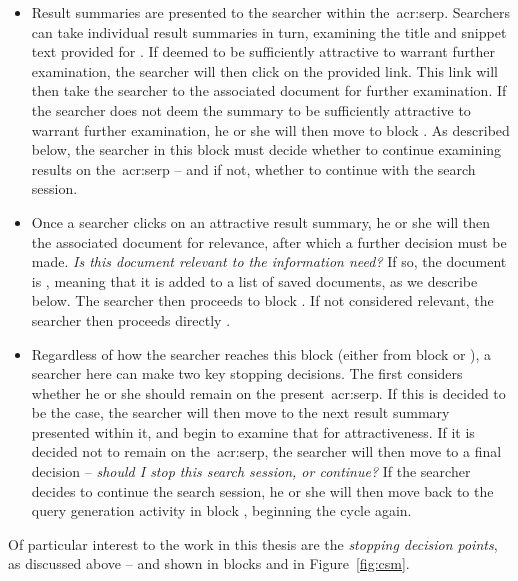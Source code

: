 \begin{itemize}
    \item[\blueboxbold{D}]{ Result summaries are presented to the searcher within the~\gls{acr:serp}. Searchers can take individual result summaries in turn, examining the title and snippet text provided for . If deemed to be sufficiently attractive to warrant further examination, the searcher will then click on the provided link. This link will then take the searcher to the associated document for further examination. If the searcher does not deem the summary to be sufficiently attractive to warrant further examination, he or she will then move to block . As described below, the searcher in this block must decide whether to continue examining results on the~\gls{acr:serp} -- and if not, whether to continue with the search session.}
    
    \item[\blueboxbold{E}]{ Once a searcher clicks on an attractive result summary, he or she will then  the associated document for relevance, after which a further decision must be made. \emph{Is this document relevant to the information need?} If so, the document is , meaning that it is added to a list of saved documents, as we describe below. The searcher then proceeds to block . If not considered relevant, the searcher then proceeds directly .}
    
    \item[\blueboxbold{F}]{ Regardless of how the searcher reaches this block (either from block  or ), a searcher here can make two key stopping decisions. The first considers whether he or she should remain on the present~\gls{acr:serp}. If this is decided to be the case, the searcher will then move to the next result summary presented within it, and begin to examine that for attractiveness. If it is decided not to remain on the~\gls{acr:serp}, the searcher will then move to a final decision -- \emph{should I stop this search session, or continue?} If the searcher decides to continue the search session, he or she will then move back to the query generation activity in block , beginning the cycle again.}
    
\end{itemize}

Of particular interest to the work in this thesis are the \emph{stopping decision points}, as discussed above -- and shown in blocks  and  in Figure~\ref{fig:csm}.

